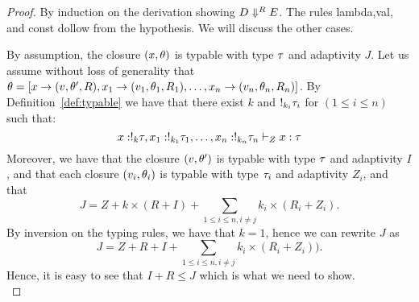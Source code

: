    \begin{proof}
     By induction on the derivation showing $D \mathrel{\Downarrow^{R}} E$. The
     rules \textsf{lambda},\textsf{val}, and \textsf{const} dollow
     from the hypothesis. We will discuss the other cases. \\


     By assumption, the closure $(x,\theta)$ is typable with type
     $\tau$ and adaptivity $J$. Let us assume without loss of
     generality that
     $\theta=[x\to (v , \theta' , R ), x_1 \to (v_1 , \theta_1 , R_1 ) , \ldots, x_n \to
     (v_n, \theta_n, R_n )]$.  By Definition~\ref{def:typable} we have that
     there exist $k$ and $!_{k_i} \tau_i$ for $(1\leq i\leq n)$ such
     that:
     \[ x: !_{k}\tau, x_1 : !_{k_1} \tau_1, \ldots, x_n:!_{k_n} \tau_n \vdash_{Z} x : \tau \]
    Moreover, we have that the closure $(v,\theta')$ is typable with
    type $\tau$ and adaptivity $I$, and that each closure $ (v_i, \theta_i) $ is
    typable with type $\tau_i$ and adaptivity $Z_i$, and that 
$$J = Z + k\times (R+I)+ \sum_{1\leq
  i\leq n, i\neq j} k_i \times (R_i
  +Z_i).$$
By inversion on the typing rules, we have that $k= 1$, hence
we can rewrite $J$ as 
$$J = Z + R+I+ \sum_{1\leq
  i\leq n, i\neq j} k_i \times (R_i
  +Z_i)).$$
Hence, it is easy to see that $ I+R\leq J$ which is
what we need to show.\\



\end{proof}
